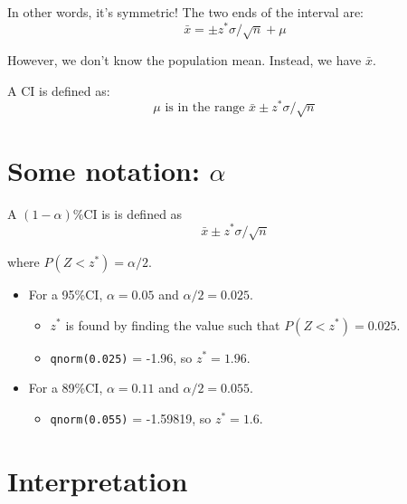 \documentclass[
  letterpaper,
  DIV=11,
  numbers=noendperiod]{scrreprt}
\providecommand{\tightlist}{%
  \setlength{\itemsep}{0pt}\setlength{\parskip}{0pt}}\usepackage{longtable,booktabs,array}
\begin{document}
In other words, it's symmetric! The two ends of the interval are: \[
\bar x = \pm z^*\sigma/\sqrt{n} + \mu
\]

However, we don't know the population mean. Instead, we have \(\bar x\).

A CI is defined as: \[
\mu \text{ is in the range } \bar x \pm z^*\sigma/\sqrt{n}
\]

\hypertarget{some-notation-alpha}{%
\section{\texorpdfstring{Some notation:
\(\alpha\)}{Some notation: \textbackslash alpha}}\label{some-notation-alpha}}

A \((1-\alpha)\%\)CI is is defined as \[
\bar x \pm z^*\sigma/\sqrt{n}
\]

where \(P(Z < z^*) = \alpha/2\).\newline

\begin{itemize}
\tightlist
\item
  For a 95\%CI, \(\alpha = 0.05\) and \(\alpha/2= 0.025\).

  \begin{itemize}
  \tightlist
  \item
    \(z^*\) is found by finding the value such that
    \(P(Z <z^*) = 0.025\).
  \item
    \texttt{qnorm(0.025)} = -1.96, so \(z^* = 1.96\).
  \end{itemize}
\item
  For a 89\%CI, \(\alpha = 0.11\) and \(\alpha/2 = 0.055\).

  \begin{itemize}
  \tightlist
  \item
    \texttt{qnorm(0.055)} = -1.59819, so \(z^* = 1.6\).
  \end{itemize}
\end{itemize}

\hypertarget{interpretation}{%
\section{Interpretation}\label{interpretation}}
\end{document}
